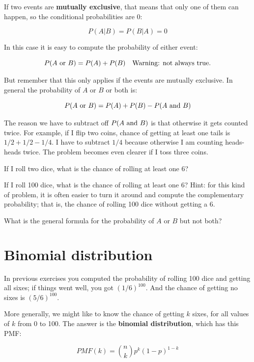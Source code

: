 \documentclass[12pt]{book}
\begin{document}
If two events are {\bf mutually exclusive}, that means that only
one of them can happen, so the conditional probabilities are 0:

\[ P(A|B) = P(B|A) = 0 \]

In this case it is easy to compute the probability of either event:

\[ P(A ~\mbox{or}~ B) = P(A) + P(B)   \quad \mbox{Warning: not always true.} \]

But remember that this only applies if the events are mutually
exclusive.  In general the probability of $A$ or $B$ or both is:

\[ P(A ~\mbox{or}~ B) = P(A) + P(B) - P(A ~\mbox{and}~ B) \]

The reason we have to subtract off $P(A ~\mbox{and}~ B)$ is that otherwise it
gets counted twice.  For example, if I flip two coins, chance of
getting at least one tails is $1/2 + 1/2 - 1/4$.  I have to subtract
$1/4$ because otherwise I am counting heads-heads twice.  The problem
becomes even clearer if I toss three coins.

\begin{ex}
If I roll two dice, what is the chance of rolling at least one 6?
\end{ex}

\begin{ex}
If I roll 100 dice, what is the chance of rolling at least one 6?
Hint: for this kind of problem, it is often easier to turn it around
and compute the complementary probability; that is, the chance of
rolling 100 dice without getting a 6.
\end{ex}

\begin{ex}
What is the general formula for the probability of $A$ or $B$ but not both?
\end{ex}


\section{Binomial distribution}

In previous exercises you computed the probability of rolling 100
dice and getting all sixes; if things went well, you got $(1/6)^{100}$.
And the chance of getting no sixes is $(5/6)^{100}$.

More generally, we might like to know the chance of getting $k$
sixes, for all values of $k$ from 0 to 100.  The answer is the
{\bf binomial distribution}, which has this PMF:

\[ PMF(k) = \binom{n}{k} p^k (1-p)^{1-k}\]
\end{document}
